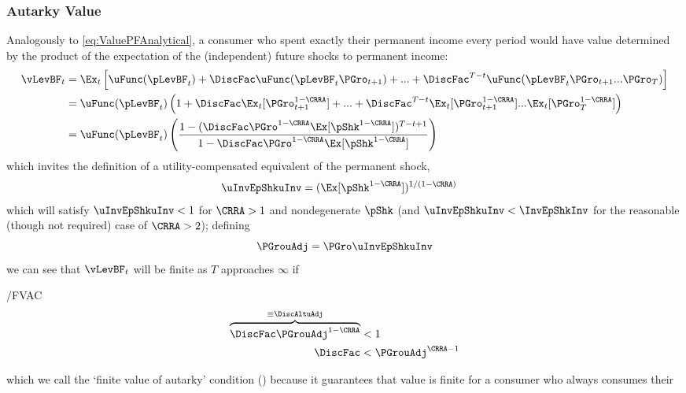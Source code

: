 \documentclass[BufferStockTheory]{subfiles}
\begin{document}
\hypertarget{Autarky-Value}{}
\subsubsection{Autarky Value}
Analogously to \eqref{eq:ValuePFAnalytical}, a consumer who spent exactly their permanent income every period would have value determined by the product of the expectation of the (independent) future shocks to permanent income:
\begin{align*}
  \vLevBF_{t}  & = \Ex_{t}\left[\uFunc(\pLevBF_{t}) + \DiscFac \uFunc(\pLevBF_{t}\PGro_{t+1}) + ... + \DiscFac^{T-t}\uFunc(\pLevBF_{t}\PGro_{t+1}...\PGro_{T})\right] \\
               & = \uFunc(\pLevBF_{t})\left(1+ \DiscFac \Ex_{t}[\PGro_{t+1}^{1-\CRRA}] +  ... + \DiscFac^{T-t}\Ex_{t}[\PGro_{t+1}^{1-\CRRA}]...\Ex_{t}[\PGro_{T}^{1-\CRRA}]\right) \\
               & = \uFunc(\pLevBF_{t})\left(\frac{1-(\DiscFac \PGro^{1-\CRRA}\Ex[\pShk^{1-\CRRA}])^{T-t+1}}{1-\DiscFac \PGro^{1-\CRRA} \Ex[\pShk^{1-\CRRA}]}\right)
\end{align*}
which invites the definition of a utility-compensated equivalent of the permanent shock,
\begin{align*}
  \uInvEpShkuInv  & = (\Ex[\pShk^{1-\CRRA}])^{1/(1-\CRRA)}
\end{align*}
which will satisfy $\uInvEpShkuInv < 1$ for $\CRRA>1$ and nondegenerate $\pShk$ (and $\uInvEpShkuInv < \InvEpShkInv$ for the reasonable (though not required) case of $\CRRA > 2$); defining
\begin{equation}
  \label{eq:PGrouAdj}
 \PGrouAdj = \PGro \uInvEpShkuInv 
\end{equation}
we can see that $\vLevBF_{t}$ will be finite as $T$ approaches $\infty$ if
\hypertarget{FVAC}{}
\begin{verbatimwrite}{\EqDir/FVAC}
  \begin{equation}\begin{gathered}\begin{aligned}
    \overbrace{\DiscFac \PGrouAdj^{1-\CRRA} }^{\equiv \DiscAltuAdj}  & < 1 \label{eq:FVAC}
    \\ \DiscFac  & < \PGrouAdj^{\CRRA-1} \notag
  \end{aligned}\end{gathered}\end{equation}
\end{verbatimwrite}
 which we call the `finite value of autarky'
condition (\FVAC) because it guarantees that value is finite for a consumer who always consumes their 
\end{document}
